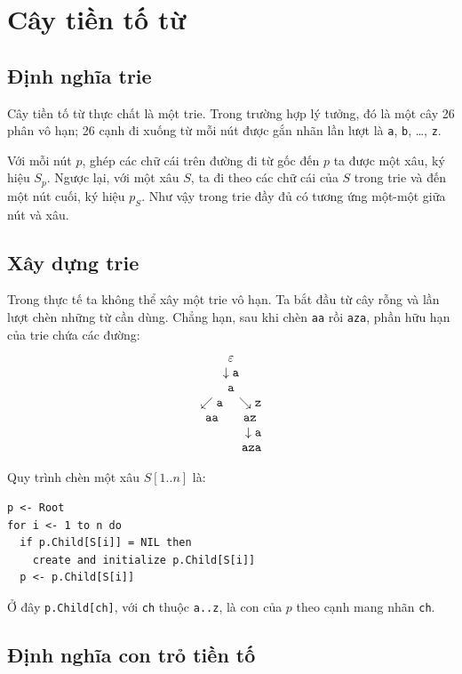\documentclass[11pt]{article}
\begin{document}
\section{Cây tiền tố từ}

\subsection{Định nghĩa trie}

Cây tiền tố từ thực chất là một trie. Trong trường hợp lý tưởng, đó là một cây
26 phân vô hạn; 26 cạnh đi xuống từ mỗi nút được gắn nhãn lần lượt là
\texttt{a}, \texttt{b}, \ldots, \texttt{z}.

Với mỗi nút $p$, ghép các chữ cái trên đường đi từ gốc đến $p$ ta được một
xâu, ký hiệu $S_p$. Ngược lại, với một xâu $S$, ta đi theo các chữ cái của
$S$ trong trie và đến một nút cuối, ký hiệu $p_S$. Như vậy trong trie đầy đủ
có tương ứng một-một giữa nút và xâu.

\subsection{Xây dựng trie}

Trong thực tế ta không thể xây một trie vô hạn. Ta bắt đầu từ cây rỗng và lần
lượt chèn những từ cần dùng. Chẳng hạn, sau khi chèn \texttt{aa} rồi
\texttt{aza}, phần hữu hạn của trie chứa các đường:
\[
\begin{array}{c}
\varepsilon\\
\downarrow\texttt{a}\\
\texttt{a}\\
\swarrow\texttt{a}\quad\searrow\texttt{z}\\
\texttt{aa}\qquad\texttt{az}\\
\hfill\downarrow\texttt{a}\\
\hfill\texttt{aza}
\end{array}
\]

Quy trình chèn một xâu $S[1..n]$ là:

\begin{verbatim}
p <- Root
for i <- 1 to n do
  if p.Child[S[i]] = NIL then
    create and initialize p.Child[S[i]]
  p <- p.Child[S[i]]
\end{verbatim}

Ở đây \texttt{p.Child[ch]}, với \texttt{ch} thuộc \texttt{a..z}, là con của
$p$ theo cạnh mang nhãn \texttt{ch}.

\subsection{Định nghĩa con trỏ tiền tố}
\end{document}
